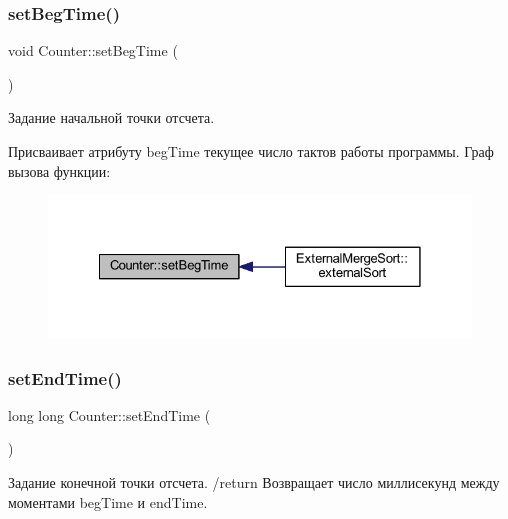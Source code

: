 \subsubsection{\texorpdfstring{set\+Beg\+Time()}{setBegTime()}}
{\footnotesize\ttfamily void Counter\+::set\+Beg\+Time (\begin{DoxyParamCaption}{ }\end{DoxyParamCaption})}



Задание начальной точки отсчета. 

Присваивает атрибуту beg\+Time текущее число тактов работы программы. Граф вызова функции\+:\nopagebreak
\begin{figure}[H]
\begin{center}
\leavevmode
\includegraphics[width=328pt]{class_counter_a71dea1262b81493aa9734f62a72b2691_icgraph}
\end{center}
\end{figure}
\hypertarget{class_counter_a563ab520e0e9ea20d4d4d113f566658a}{}\label{class_counter_a563ab520e0e9ea20d4d4d113f566658a} 
\subsubsection{\texorpdfstring{set\+End\+Time()}{setEndTime()}}
{\footnotesize\ttfamily long long Counter\+::set\+End\+Time (\begin{DoxyParamCaption}{ }\end{DoxyParamCaption})}



Задание конечной точки отсчета. /return Возвращает число миллисекунд между моментами beg\+Time и end\+Time. 

